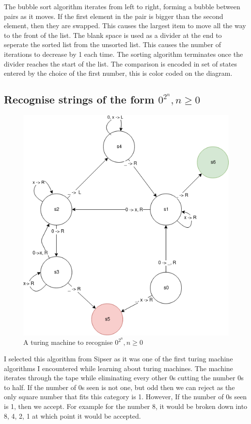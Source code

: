 \documentclass{article}
\begin{document}
The bubble sort algorithm iterates from left to right, forming a bubble between pairs as it moves. If the first element in the pair is bigger than the second element, then they are swapped. This causes the largest item to move all the way to the front of the list. The blank space is used as a divider at the end to seperate the sorted list from the unsorted list. This causes the number of iterations to decrease by 1 each time. The sorting algorithm terminates once the divider reaches the start of the list. The comparison is encoded in set of states entered by the choice of the first number, this is color coded on the diagram.


\newpage

\subsection{Recognise strings of the form $0^{2^n}, n \geq 0$}

\begin{figure}[!htb]
  \caption{A turing machine to recognise $0^{2^n}, n \geq 0$}
  \centering
  \includegraphics[scale=0.30]{images/square0s.png}
\end{figure}


I selected this algorithm from Sipser as it was one of the first turing machine algorithms I encountered while learning about turing machines. The machine iterates through the tape while eliminating every other 0s cutting the number 0s to half. If the number of 0s seen is not one, but odd then we can reject as the only square number that fits this category is 1. However, If the number of 0s seen is 1, then we accept. For example for the number 8, it would be broken down into 8, 4, 2, 1 at which point it would be accepted.
\end{document}
